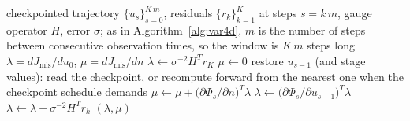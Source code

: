 \documentclass[11pt]{article}
\begin{document}
\begin{algorithm}
\caption{\textsc{AdjointSweep}: segmented discrete-adjoint backward
sweep (\texttt{TSAdjointSolve} with \texttt{TSAdjointSetSteps}).
$\Phi_s$ denotes the forward map of step $s$, $u_s =
\Phi_s(u_{s-1}; n)$; its transposed Jacobians are built from the
assembled RHS Jacobian $\partial f/\partial u$
(Section~\ref{sec:jacobian}) and the parameter Jacobian $\partial
f/\partial n$ according to the integrator's discrete-adjoint formula.}
\label{alg:sweep}
\begin{algorithmic}[1]
\Require checkpointed trajectory $\{u_s\}_{s=0}^{K\,m}$, residuals
$\{r_k\}_{k=1}^{K}$ at steps $s = k\,m$, gauge operator $H$, error $\sigma$; as in
Algorithm~\ref{alg:var4d}, $m$ is the number of steps between
consecutive observation times, so the window is $K\,m$ steps long
\Ensure $\lambda = dJ_{\mathrm{mis}}/du_0$,\;
$\mu = dJ_{\mathrm{mis}}/dn$
\State $\lambda \gets \sigma^{-2} H^T r_K$
\State $\mu \gets 0$
   \State restore $u_{s-1}$ (and stage values): read the checkpoint,
          or recompute forward from the nearest one when the
          checkpoint schedule demands
   \State $\mu \gets \mu +
          \big(\partial\Phi_s/\partial n\big)^T \lambda$
   \State $\lambda \gets
          \big(\partial\Phi_s/\partial u_{s-1}\big)^T \lambda$
      \State $\lambda \gets \lambda + \sigma^{-2} H^T r_{k}$
   \EndIf
\EndFor
\State \Return $(\lambda, \mu)$
\end{algorithmic}
\end{algorithm}
\end{document}
